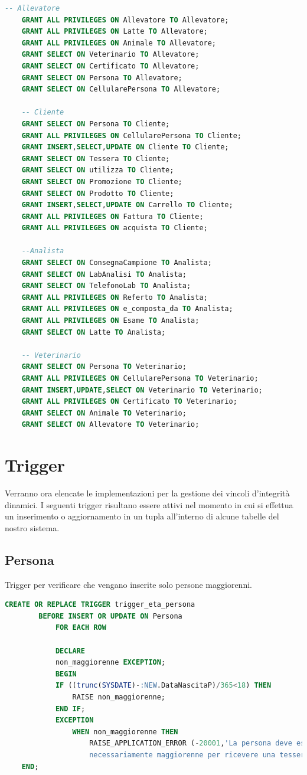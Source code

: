 \documentclass[12pt]{report}
\begin{document}
\begin{lstlisting}[language=SQL,caption={DCL\_UTENTI}]
	-- Allevatore
	GRANT ALL PRIVILEGES ON Allevatore TO Allevatore;
	GRANT ALL PRIVILEGES ON Latte TO Allevatore;
	GRANT ALL PRIVILEGES ON Animale TO Allevatore;
	GRANT SELECT ON Veterinario TO Allevatore;
	GRANT SELECT ON Certificato TO Allevatore;
	GRANT SELECT ON Persona TO Allevatore;
	GRANT SELECT ON CellularePersona TO Allevatore;

	-- Cliente
	GRANT SELECT ON Persona TO Cliente;
	GRANT ALL PRIVILEGES ON CellularePersona TO Cliente;
	GRANT INSERT,SELECT,UPDATE ON Cliente TO Cliente;
	GRANT SELECT ON Tessera TO Cliente;
	GRANT SELECT ON utilizza TO Cliente;
	GRANT SELECT ON Promozione TO Cliente;
	GRANT SELECT ON Prodotto TO Cliente;
	GRANT INSERT,SELECT,UPDATE ON Carrello TO Cliente;
	GRANT ALL PRIVILEGES ON Fattura TO Cliente;
	GRANT ALL PRIVILEGES ON acquista TO Cliente;
	
	--Analista
	GRANT SELECT ON ConsegnaCampione TO Analista;
	GRANT SELECT ON LabAnalisi TO Analista;
	GRANT SELECT ON TelefonoLab TO Analista;
	GRANT ALL PRIVILEGES ON Referto TO Analista;
	GRANT ALL PRIVILEGES ON e_composta_da TO Analista;
	GRANT ALL PRIVILEGES ON Esame TO Analista;
	GRANT SELECT ON Latte TO Analista;
	
	-- Veterinario
	GRANT SELECT ON Persona TO Veterinario;
	GRANT ALL PRIVILEGES ON CellularePersona TO Veterinario;
	GRANT INSERT,UPDATE,SELECT ON Veterinario TO Veterinario;
	GRANT ALL PRIVILEGES ON Certificato TO Veterinario;
	GRANT SELECT ON Animale TO Veterinario;
	GRANT SELECT ON Allevatore TO Veterinario;

\end{lstlisting}

\newpage

\section{Trigger}

Verranno ora elencate le implementazioni per la gestione dei vincoli d'integrità dinamici. I seguenti trigger risultano essere attivi nel momento in cui si effettua un inserimento o aggiornamento in un tupla all'interno di alcune tabelle del nostro sistema.

\subsection*{Persona}
Trigger per verificare che vengano inserite solo persone maggiorenni.

\begin{lstlisting}[language=SQL,caption={TR\_PERSONA}]
    CREATE OR REPLACE TRIGGER trigger_eta_persona
        BEFORE INSERT OR UPDATE ON Persona
	        FOR EACH ROW
	
	 	    DECLARE
		    non_maggiorenne EXCEPTION;
		    BEGIN
		    IF ((trunc(SYSDATE)-:NEW.DataNascitaP)/365<18) THEN 
		        RAISE non_maggiorenne;
		    END IF;
		    EXCEPTION
			    WHEN non_maggiorenne THEN
			        RAISE_APPLICATION_ERROR (-20001,'La persona deve essere
			        necessariamente maggiorenne per ricevere una tessera.');
	END;
\end{lstlisting}
\end{document}
